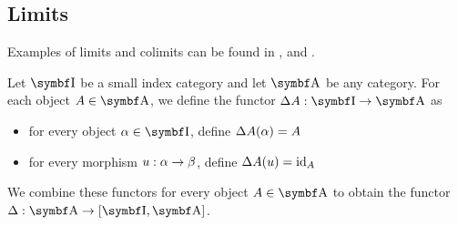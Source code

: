 \subsection{Limits}\label{subsec:categorical_limits}

\begin{remark}\label{def:categorical_limit_examples}
  Examples of limits and colimits can be found in ,  and .
\end{remark}

\begin{definition}\label{def:diagonal_functor}\cite[143]{Leinster2014}
  Let \( \Cat{I} \) be a small index category and let \( \Cat{A} \) be any category. For each object \( A \in \Cat{A} \), we define the functor \( \Delta A: \Cat{I} \to \Cat{A} \) as
  \begin{itemize}
    \item for every object \( \al \in \Cat{I} \), define \( \Delta A(\alpha) = A \)
    \item for every morphism \( u: \alpha \to \beta \), define \( \Delta A(u) = \operatorname{id}_A \)
  \end{itemize}

  We combine these functors for every object \( A \in \Cat{A} \) to obtain the functor \( \Delta: \Cat{A} \to [\Cat{I}, \Cat{A}] \).
\end{definition}

